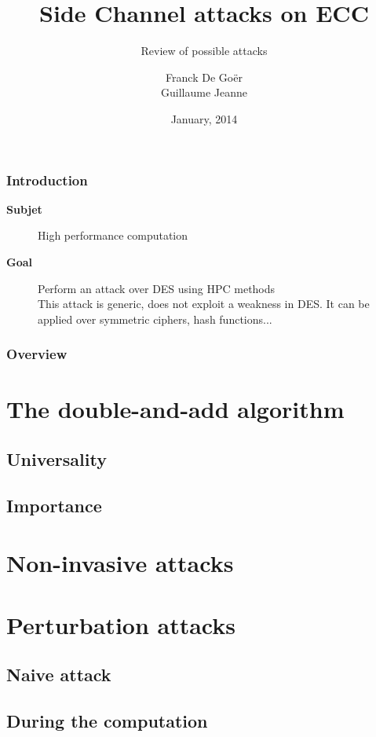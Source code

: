 \documentclass{beamer}
\title[ECC Side channel attacks]{Side Channel attacks on ECC}
\subtitle{Review of possible attacks}
\author{Franck De Goër\\Guillaume Jeanne}
\institute{SCCI - Ensimag}
\date{January, 2014}
\begin{document}
\begin{frame}
    \titlepage
\end{frame}

\begin{frame}[t]
    \frametitle{Introduction}
    \vspace{1cm}
    \begin{description}
        \item[{\bf Subjet}] High performance computation
        \item[{\bf Goal}] Perform an attack over DES using HPC methods\\
	This attack is generic, does not exploit a weakness in DES.
	It can be applied over symmetric ciphers, hash functions...
    \end{description}
\end{frame}

\begin{frame}
    \frametitle{Overview}
    \tableofcontents
\end{frame}


\section{The double-and-add algorithm}
    \subsection{Universality}
    \subsection{Importance}

\section{Non-invasive attacks}

\section{Perturbation attacks}
    \subsection{Naive attack}
    \subsection{During the computation}
\end{document}
